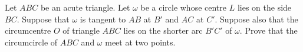Let 
$ABC$
 be an acute triangle. Let 
$\omega$
 be a circle whose centre 
$L$
 lies on the side 
$BC$.
 Suppose that 
$\omega$
 is tangent to 
$AB$
 at 
$B'$
 and 
$AC$
 at 
$C'$.
 Suppose also that the circumcentre 
$O$
 of triangle 
$ABC$
 lies on the shorter arc 
$B'C'$
 of 
$\omega$.
 Prove that the circumcircle of 
$ABC$
 and 
$\omega$
 meet at two points.
